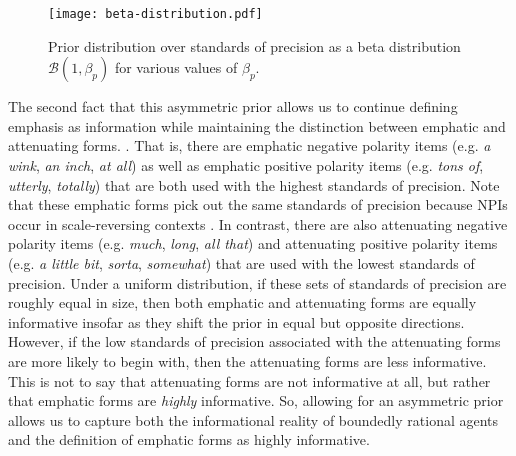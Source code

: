 \documentclass[linguex]{sp}
\theoremstyle{definition} \newtheorem{definition}{Definition}
\begin{document}
\begin{figure}
\begin{center}
	\texttt{[image: beta-distribution.pdf]}
	\caption{Prior distribution over standards of precision as a beta distribution $\mathcal{B}(1, \beta_p)$ for various values of $\beta_p$.}
	\label{beta}
\end{center}
\end{figure}


The second fact that this asymmetric prior allows us to continue defining emphasis as information while maintaining the distinction between emphatic and attenuating forms.  \citep{israel2011}. That is, there are emphatic negative polarity items (e.g. \emph{a wink}, \emph{an inch}, \emph{at all}) as well as emphatic positive polarity items (e.g. \emph{tons of}, \emph{utterly}, \emph{totally}) that are both used with the highest standards of precision. Note that these emphatic forms pick out the same standards of precision because NPIs occur in scale-reversing contexts \citep{fauconnier1975}. In contrast, there are also attenuating negative polarity items (e.g. \emph{much}, \emph{long}, \emph{all that}) and attenuating positive polarity items (e.g. \emph{a little bit}, \emph{sorta}, \emph{somewhat}) that are used with the lowest standards of precision. Under a uniform distribution, if these sets of standards of precision are roughly equal in size, then both emphatic and attenuating forms are equally informative insofar as they shift the prior in equal but opposite directions. However, if the low standards of precision associated with the attenuating forms are more likely to begin with, then the attenuating forms are less informative. This is not to say that attenuating forms are not informative at all, but rather that emphatic forms are \emph{highly} informative.  So, allowing for an asymmetric prior allows us to capture both the informational reality of boundedly rational agents and the definition of emphatic forms as highly informative.
\end{document}
